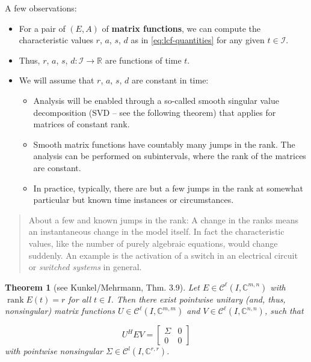 \documentclass[]{book}
\providecommand{\tightlist}{%
  \setlength{\itemsep}{0pt}\setlength{\parskip}{0pt}}
\newenvironment {JHSAYS} [0] {\begin{quote}\color{jhsc}} {\end{quote}}
\newtheorem{theorem}{Theorem}[chapter]
\theoremstyle{definition}
\theoremstyle{definition}
\theoremstyle{definition}
\theoremstyle{definition}
\theoremstyle{remark}
\begin{document}
A few observations:

\begin{itemize}
\tightlist
\item
  For a pair of \((E, A)\) of \textbf{matrix functions}, we can compute the characteristic values \(r\), \(a\), \(s\), \(d\) as in \eqref{eq:lcf-quantities} for any given \(t\in \mathcal I\).
\item
  Thus, \(r\), \(a\), \(s\), \(d\colon \mathcal I \to \mathbb R\) are functions of time \(t\).
\item
  We will assume that \(r\), \(a\), \(s\), \(d\) are constant in time:

  \begin{itemize}
  \tightlist
  \item
    Analysis will be enabled through a so-called smooth singular value decomposition (SVD -- see the following theorem) that applies for matrices of constant rank.
  \item
    Smooth matrix functions have countably many jumps in the rank. The analysis can be performed on subintervals, where the rank of the matrices are constant.
  \item
    In practice, typically, there are but a few jumps in the rank at somewhat particular but known time instances or circumstances.
  \end{itemize}
\end{itemize}

\begin{JHSAYS}
About a few and known jumps in the rank: A change in the ranks means an
instantaneous change in the model itself. In fact the characteristic
values, like the number of purely algebraic equations, would change
suddenly. An example is the activation of a switch in an electrical
circuit or \emph{switched systems} in general.
\end{JHSAYS}

\begin{theorem}[see Kunkel/Mehrmann, Thm. 3.9]
\protect\hypertarget{thm:continuous-svd}{}{\label{thm:continuous-svd} {} }
Let \(E\in \mathcal C^\ell(I, \mathbb C^{m,n})\) with \(\operatorname{rank}E(t)=r\) for all \(t\in I\). Then there exist pointwise unitary (and, thus, nonsingular) matrix functions \(U\in \mathcal C^\ell(I, \mathbb C^{m,m})\) and \(V\in \mathcal C^\ell(I, \mathbb C^{n,n})\), such that

\[
 U^HEV =
 \begin{bmatrix}
 \Sigma & 0 \\
 0 & 0
 \end{bmatrix}
\]
with pointwise nonsingular \(\Sigma \in \mathcal C^l(I, \mathbb C^{r,r})\).
\end{theorem}
\end{document}
